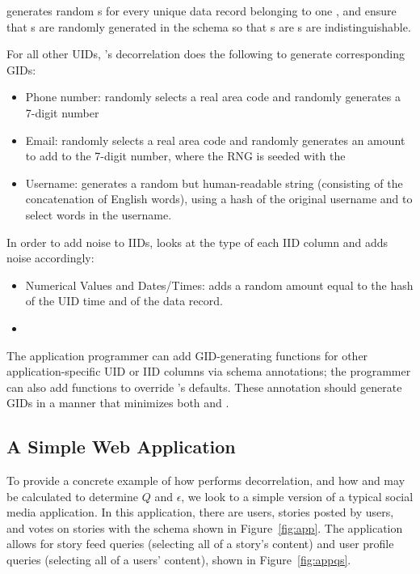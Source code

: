 \sys{} generates random \gidkey{}s for every unique data record belonging to one
\uidkey{}, and ensure that \uidkey{}s are randomly generated in the schema so
that \gidkey{}s are \uidkey{}s are indistinguishable.

For all other UIDs, \sys's decorrelation does the following to generate corresponding GIDs:
\begin{itemize}
    \item Phone number: randomly selects a real area code and randomly generates a 7-digit number
    \item Email: randomly selects a real area code and randomly generates an amount to add to the 7-digit number, where the RNG is seeded with the \gidkey{}
    \item Username: generates a random but human-readable string (consisting of the
        concatenation of English words), using a hash of the original username and
        \gidkey{} to select words in the username.
\end{itemize}

In order to add noise to IIDs, \sys{} looks at the type of each IID column and
adds noise accordingly:
\begin{itemize}
\item Numerical Values and Dates/Times: adds a random amount equal to the
         hash of the UID time and \gidkey{} of the data record.
    \item 
\end{itemize}

The application programmer can add GID-generating functions for other application-specific UID or
IID columns via schema annotations; the programmer can also add functions to override \sys's
defaults.  These annotation should generate GIDs in a manner that minimizes both \premnant{} and
\plinked{}.


\subsection{A Simple Web Application}
To provide a concrete example of how \sys{} performs decorrelation, and how \plinked{} and
\premnant{} may be calculated to determine $Q$ and $\epsilon$, we look to a simple version of a typical social media 
application.
In this application, there are users, stories posted by users, and votes on stories with the schema
shown in Figure~\ref{fig:app}.
The application allows for story feed queries (selecting all of a story's content) and user profile
queries (selecting all of a users' content), shown in Figure~\ref{fig:appqs}.

